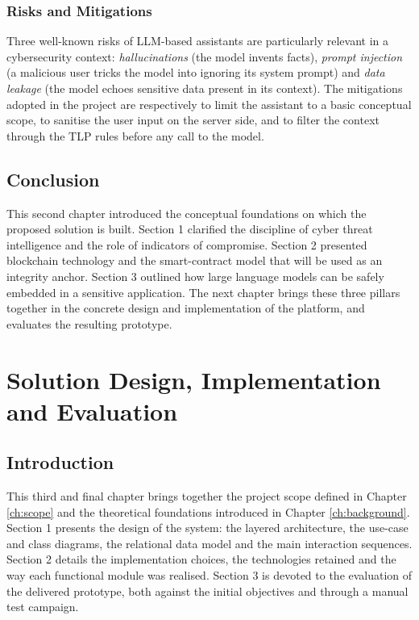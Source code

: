 \documentclass[12pt,a4paper,oneside]{book}
\begin{document}
{{\subsection{Risks and Mitigations}

Three well-known risks of LLM-based assistants are particularly relevant in
a cybersecurity context: \emph{hallucinations} (the model invents facts),
\emph{prompt injection} (a malicious user tricks the model into ignoring
its system prompt) and \emph{data leakage} (the model echoes sensitive data
present in its context). The mitigations adopted in the project are
respectively to limit the assistant to a basic conceptual scope, to
sanitise the user input on the server side, and to filter the context
through the TLP rules before any call to the model.

\section*{Conclusion}
This second chapter introduced the conceptual foundations on which the
proposed solution is built. Section 1 clarified the discipline of cyber
threat intelligence and the role of indicators of compromise. Section 2
presented blockchain technology and the smart-contract model that will be
used as an integrity anchor. Section 3 outlined how large language models
can be safely embedded in a sensitive application. The next chapter brings
these three pillars together in the concrete design and implementation of
the platform, and evaluates the resulting prototype.

\chapter{Solution Design, Implementation and Evaluation}
\label{ch:solution}
\section*{Introduction}
This third and final chapter brings together the project scope defined in
Chapter \ref{ch:scope} and the theoretical foundations introduced in
Chapter \ref{ch:background}. Section 1 presents the design of the system:
the layered architecture, the use-case and class diagrams, the relational
data model and the main interaction sequences. Section 2 details the
implementation choices, the technologies retained and the way each
functional module was realised. Section 3 is devoted to the evaluation of
the delivered prototype, both against the initial objectives and through a
manual test campaign.

}}
\end{document}
